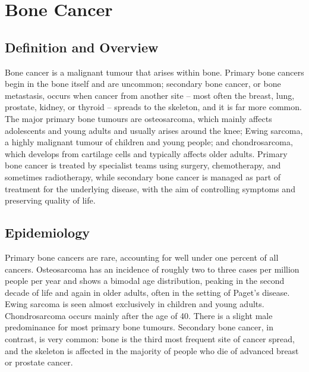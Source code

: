 \chapter{Bone Cancer}

\section*{Definition and Overview}
Bone cancer is a malignant tumour that arises within bone. Primary bone cancers begin in the bone itself and are uncommon; secondary bone cancer, or bone metastasis, occurs when cancer from another site -- most often the breast, lung, prostate, kidney, or thyroid -- spreads to the skeleton, and it is far more common. The major primary bone tumours are osteosarcoma, which mainly affects adolescents and young adults and usually arises around the knee; Ewing sarcoma, a highly malignant tumour of children and young people; and chondrosarcoma, which develops from cartilage cells and typically affects older adults. Primary bone cancer is treated by specialist teams using surgery, chemotherapy, and sometimes radiotherapy, while secondary bone cancer is managed as part of treatment for the underlying disease, with the aim of controlling symptoms and preserving quality of life.

\section*{Epidemiology}
Primary bone cancers are rare, accounting for well under one percent of all cancers. Osteosarcoma has an incidence of roughly two to three cases per million people per year and shows a bimodal age distribution, peaking in the second decade of life and again in older adults, often in the setting of Paget's disease. Ewing sarcoma is seen almost exclusively in children and young adults. Chondrosarcoma occurs mainly after the age of 40. There is a slight male predominance for most primary bone tumours. Secondary bone cancer, in contrast, is very common: bone is the third most frequent site of cancer spread, and the skeleton is affected in the majority of people who die of advanced breast or prostate cancer.

